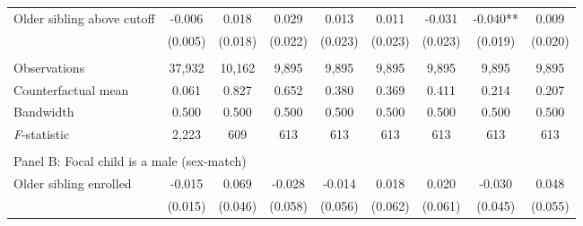 \begin{table}[!htbp]
{{\begin{tabular}{lcccccccc}
Older sibling above cutoff&      -0.006   &       0.018   &       0.029   &       0.013   &       0.011   &      -0.031   &      -0.040** &       0.009   \\
                    &     (0.005)   &     (0.018)   &     (0.022)   &     (0.023)   &     (0.023)   &     (0.023)   &     (0.019)   &     (0.020)   \\
                    &               &               &               &               &               &               &               &               \\
Observations        &      37,932   &      10,162   &       9,895   &       9,895   &       9,895   &       9,895   &       9,895   &       9,895   \\
Counterfactual mean &       0.061   &       0.827   &       0.652   &       0.380   &       0.369   &       0.411   &       0.214   &       0.207   \\
Bandwidth           &       0.500   &       0.500   &       0.500   &       0.500   &       0.500   &       0.500   &       0.500   &       0.500   \\
\textit{F}-statistic&       2,223   &         609   &         613   &         613   &         613   &         613   &         613   &         613   \\
 
&  &  &  &  \\
\multicolumn{10}{l}{Panel B: Focal child is a male (sex-match)} \\
Older sibling enrolled&      -0.015   &       0.069   &      -0.028   &      -0.014   &       0.018   &       0.020   &      -0.030   &       0.048   \\
                    &     (0.015)   &     (0.046)   &     (0.058)   &     (0.056)   &     (0.062)   &     (0.061)   &     (0.045)   &     (0.055)   \\
 

\end{tabular}}}
\end{table}
